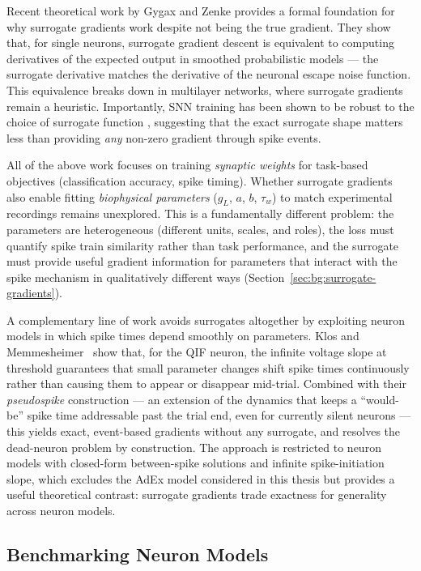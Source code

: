 Recent theoretical work by Gygax and Zenke \cite{Gygax2025} provides a formal foundation for why surrogate gradients work despite not being the true gradient.
They show that, for single neurons, surrogate gradient descent is equivalent to computing derivatives of the expected output in smoothed probabilistic models --- the surrogate derivative matches the derivative of the neuronal escape noise function.
This equivalence breaks down in multilayer networks, where surrogate gradients remain a heuristic.
Importantly, \gls{SNN} training has been shown to be robust to the choice of surrogate function \cite{Gygax2025}, suggesting that the exact surrogate shape matters less than providing \emph{any} non-zero gradient through spike events.

All of the above work focuses on training \emph{synaptic weights} for task-based objectives (classification accuracy, spike timing).
Whether surrogate gradients also enable fitting \emph{biophysical parameters} ($g_L$, $a$, $b$, $\tau_w$) to match experimental recordings remains unexplored.
This is a fundamentally different problem: the parameters are heterogeneous (different units, scales, and roles), the loss must quantify spike train similarity rather than task performance, and the surrogate must provide useful gradient information for parameters that interact with the spike mechanism in qualitatively different ways (Section~\ref{sec:bg:surrogate-gradients}).

A complementary line of work avoids surrogates altogether by exploiting neuron models in which spike times depend smoothly on parameters.
Klos and Memmesheimer~\cite{Klos2025} show that, for the \gls{QIF} neuron, the infinite voltage slope at threshold guarantees that small parameter changes shift spike times continuously rather than causing them to appear or disappear mid-trial.
Combined with their \emph{pseudospike} construction --- an extension of the dynamics that keeps a ``would-be'' spike time addressable past the trial end, even for currently silent neurons --- this yields exact, event-based gradients without any surrogate, and resolves the dead-neuron problem by construction.
The approach is restricted to neuron models with closed-form between-spike solutions and infinite spike-initiation slope, which excludes the \gls{AdEx} model considered in this thesis but provides a useful theoretical contrast: surrogate gradients trade exactness for generality across neuron models.

\subsection{Benchmarking Neuron Models}\label{sec:rw:benchmarking}

